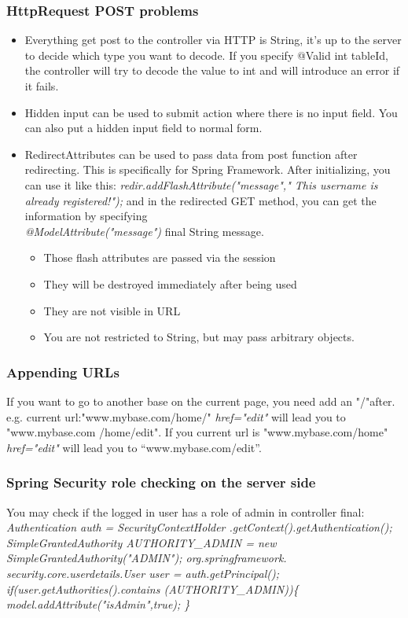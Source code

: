 \documentclass[12pt]{article}
\begin{document}
\subsubsection{HttpRequest POST problems}
\begin{itemize}
	\item Everything get post to the controller via HTTP is String, it’s up to the server to decide which type you want to decode. If you specify @Valid int tableId, the controller will try to decode the value to int and will introduce an error if it fails.
	\item Hidden input can be used to submit action where there is no input field. You can also put a hidden input field to normal form.
	\item RedirectAttributes can be used to pass data from post function after redirecting. This is specifically for Spring Framework. After initializing, you can use it like this: \textit{redir.addFlashAttribute("message"," This username is already registered!");} and in the redirected GET method, you can get the information by specifying \\\textit{@ModelAttribute("message")} final String message.
	\begin{itemize}
		\item Those flash attributes are passed via the session 
		\item They will be destroyed immediately after being used
		\item They are not visible in URL
		\item You are not restricted to String, but may pass arbitrary objects.
	\end{itemize}
\end{itemize}
\subsubsection{Appending URLs}
If you want to go to another base on the current page, you need add an "/"after.
e.g. current url:"www.mybase.com/home/" \textit{href="edit"} will lead you to "www.mybase.com /home/edit". If you current url is "www.mybase.com/home" \textit{href="edit"} will lead you to “www.mybase.com/edit”.

\subsubsection{Spring Security role checking on the server side}
You may check if the logged in user has a role of admin in controller final:
\textit{Authentication auth = SecurityContextHolder .getContext().getAuthentication();
SimpleGrantedAuthority AUTHORITY\_ADMIN = new SimpleGrantedAuthority("ADMIN"); org.springframework. security.core.userdetails.User user = auth.getPrincipal(); if(user.getAuthorities().contains (AUTHORITY\_ADMIN))\{
	model.addAttribute("isAdmin",true);
\}}
\end{document}
